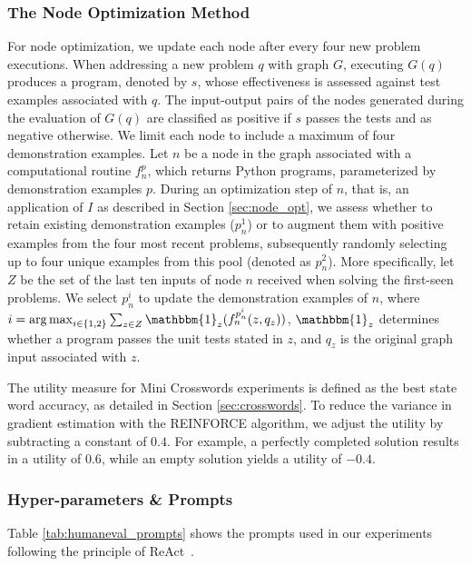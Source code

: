 \documentclass{article}
\DeclareMathOperator*{\argmax}{arg\,max}
\theoremstyle{plain}
\theoremstyle{definition}
\theoremstyle{remark}
\begin{document}
\subsubsection{The Node Optimization Method}
\label{app:humaneval_opt}
For node optimization, we update each node after every four new problem executions. When addressing a new problem $q$ with graph $G$, executing $G(q)$ produces a program, denoted by $s$, whose effectiveness is assessed against test examples associated with $q$. 
The input-output pairs of the nodes generated during the evaluation of $G(q)$ are classified as positive if $s$ passes the tests and as negative otherwise. 
We limit each node to include a maximum of four demonstration examples. 
Let $n$ be a node in the graph associated with a computational routine $f_n^p$, which returns Python programs, parameterized by demonstration examples $p$.
During an optimization step of $n$, that is, an application of $I$ as described in Section \ref{sec:node_opt}, we assess whether to retain existing demonstration examples ($p_n^1$) or to augment them with positive examples from the four most recent problems, subsequently randomly selecting up to four unique examples from this pool (denoted as $p_n^2$).
More specifically, let $Z$ be the set of the last ten inputs of node $n$ received when solving the first-seen problems.
We select $p_n^i$ to update the demonstration examples of $n$, where $i = \argmax_{i \in \{1, 2\}}\sum_{z\in Z}\mathbbm{1}_z(f_n^{p_n^i}(z, q_z))$, $\mathbbm{1}_z$ determines whether a program passes the unit tests stated in $z$, and $q_z$ is the original graph input associated with $z$.

The utility measure for Mini Crosswords experiments is defined as the best state word accuracy, as detailed in Section \ref{sec:crosswords}.
To reduce the variance in gradient estimation with the REINFORCE algorithm, we adjust the utility by subtracting a constant of $0.4$.
For example, a perfectly completed solution results in a utility of $0.6$, while an empty solution yields a utility of $-0.4$.

\subsubsection{Hyper-parameters \& Prompts}
Table \ref{tab:humaneval_prompts} shows the prompts used in our experiments following the principle of ReAct~\citep{yao2022react}.  
\end{document}
